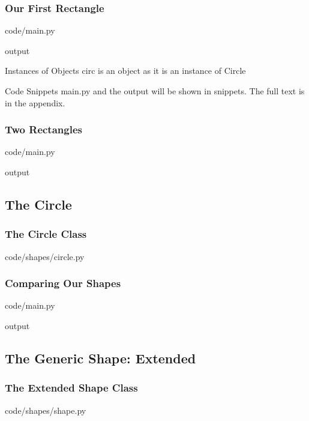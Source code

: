 \documentclass{beamer}
\newcommand{\closenewline}{%
  \par\nopagebreak
  \vspace{-\itemsep}
  \vspace{-\parsep}
}
\begin{document}
  \begin{frame}
    \frametitle{Our First Rectangle}

    code/main.py
    

    output
    
    \begin{block}{Instances of Objects}
      circ is an object as it is an instance of Circle
    \end{block}

    \begin{block}{Code Snippets}
      main.py and the output will be shown in snippets.
      The full text is in the appendix.
    \end{block}
  \end{frame}

  \begin{frame}
    \frametitle{Two Rectangles}

    code/main.py
    

    output
    
  \end{frame}


\subsection{The Circle}
  \begin{frame}
    \frametitle{The Circle Class}
    code/shapes/circle.py
    
  \end{frame}

  \begin{frame}
    \frametitle{Comparing Our Shapes}

    code/main.py
    
    \closenewline
    

    output
    
    \closenewline
    
  \end{frame}

\subsection{The Generic Shape: Extended}
  \begin{frame}
    \frametitle{The Extended Shape Class}
    code/shapes/shape.py
    
  \end{frame}
\end{document}
